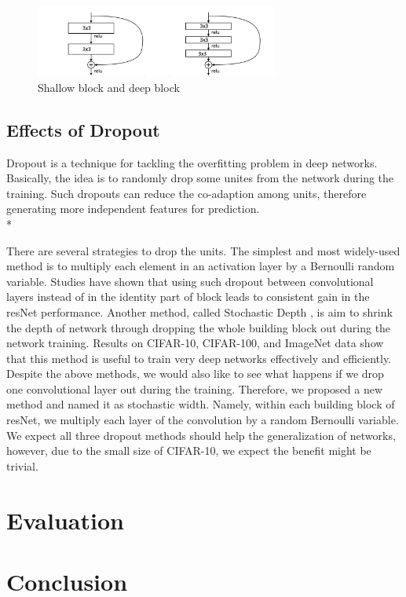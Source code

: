 \documentclass{article} %
\begin{document}
 \begin{figure}[h]
\centering
\includegraphics[width=8cm]{deepenfactor}
 \caption{Shallow block and deep block}
\end{figure}

\subsection{Effects of Dropout}

Dropout is a technique for tackling the overfitting problem in deep networks. Basically, the idea is to randomly drop some unites from the network during the training. Such dropouts can reduce the co-adaption among units, therefore generating more independent features for prediction. \\*

There are several strategies to drop the units. The simplest and most widely-used method is to multiply each element in an activation layer by a Bernoulli random variable. Studies  \cite{zagoruyko2016wide}  have shown that using such dropout between convolutional layers instead of in the identity part of block leads to consistent gain in the resNet performance. Another method, called Stochastic Depth \cite{DBLP:journals/corr/HuangSLSW16}, is aim to shrink the depth of network through dropping the whole building block out during the network training. Results on CIFAR-10, CIFAR-100, and ImageNet data show that this method is useful to train very deep networks effectively and efficiently.  Despite the above methods, we would also like to see what happens if we drop one convolutional layer out during the training. Therefore, we proposed a new method and named it as stochastic width. Namely, within each building block of resNet, we multiply each layer of the convolution by a random Bernoulli variable. We expect all three dropout methods should help the generalization of networks, however, due to the small size of CIFAR-10, we expect the benefit might be trivial. 

\section{Evaluation}
\section{Conclusion}
















 
\end{document}
